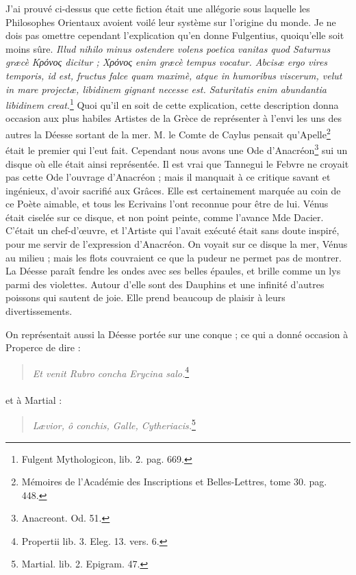 \documentclass[a4paper, 11pt, oneside, polutonikogreek, french]{article}
\begin{document}
J'ai prouvé ci-dessus que cette fiction était une allégorie sous laquelle les Philosophes Orientaux avoient voilé leur système sur l'origine du monde. Je ne dois pas omettre cependant l'explication qu'en donne Fulgentius, quoiqu'elle soit moins sûre. \emph{Illud nihilo minus ostendere volens poetica vanitas quod Saturnus græcè Κρόνος dicitur ; Χρόνος enim græcè tempus vocatur. Abcisæ ergo vires temporis, id est, fructus falce quam maximè, atque in humoribus viscerum, velut in mare projectæ, libidinem gignant necesse est. Saturitatis enim abundantia libidinem creat}.\footnote{Fulgent Mythologicon, lib. 2. pag. 669.} Quoi qu'il en soit de cette explication, cette description donna occasion aux plus habiles Artistes de la Grèce de représenter à l'envi les uns des autres la Déesse sortant de la mer. M. le Comte de Caylus pensait qu'Apelle\footnote{Mémoires de l'Académie des Inscriptions et Belles-Lettres, tome 30. pag. 448.} était le premier qui l'eut fait. Cependant nous avons une Ode d'Anacréon\footnote{Anacreont. Od. 51.} sui un disque où elle était ainsi représentée. Il est vrai que Tannegui le Febvre ne croyait pas cette Ode l'ouvrage d'Anacréon ; mais il manquait à ce critique savant et ingénieux, d'avoir sacrifié aux Grâces. Elle est certainement marquée au coin de ce Poète aimable, et tous les Ecrivains l'ont reconnue pour être de lui. Vénus était ciselée sur ce disque, et non point peinte, comme l'avance Mde Dacier. C'était un chef-d'œuvre, et l'Artiste qui l'avait exécuté était sans doute inspiré, pour me servir de l'expression d'Anacréon. On voyait sur ce disque la mer, Vénus au milieu ; mais les flots couvraient ce que la pudeur ne permet pas de montrer. La Déesse paraît fendre les ondes avec ses belles épaules, et brille comme un lys parmi des violettes. Autour d'elle sont des Dauphins et une infinité d'autres poissons qui sautent de joie. Elle prend beaucoup de plaisir à leurs divertissements.

On représentait aussi la Déesse portée sur une conque ; ce qui a donné occasion à Properce de dire :
\begin{quotation}
\emph{Et venit Rubro concha Erycina salo.}\footnote{Propertii lib. 3. Eleg. 13. vers. 6.}
\end{quotation}
\paragraph{}
et à Martial :
\begin{quotation}
\emph{Lævior, ô conchis, Galle, Cytheriacis.}\footnote{Martial. lib. 2. Epigram. 47.}
\end{quotation}
\end{document}
